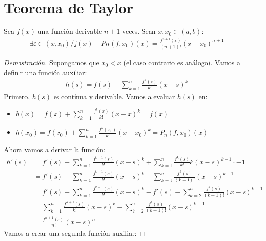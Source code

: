 \documentclass{article}
\begin{document}
\section{Teorema de Taylor}
    Sea $f(x)$ una función derivable $n+1$ veces. Sean $x,x_{0} \in  (a,b)$:
    \begin{equation}
        \begin{split}
            \exists \varepsilon \in (x,x_{0}) / f(x)-Pn(f,x_{0})(x)= \frac{f^{n+1}(\varepsilon)}{(n+1)!}(x-x_{0})^{n+1}
        \end{split}
    \end{equation}
\begin{proof}[Demostración]
    Supongamos que $x_{0}<x$ (el caso contrario es análogo). Vamos a definir una función
    auxiliar:
    \begin{equation}
        \begin{split}
            h(s)= f(s) + \sum ^n_{k=1} \frac{f^k (s)}{k!}(x-s)^{k}
        \end{split}
    \end{equation}
    Primero, $h(s)$ es contínua y derivable. Vamos a evaluar $h(s)$ en:
    \begin{itemize}
        \item $h(x)=f(x) + \sum ^n_{k=1} \frac{f^k (x)}{k!}(x-x)^{k}=f(x)$
        \item $h(x_{0})=f(x_{0})+\sum ^n_{k=1} \frac{f^k (x_{0})}{k!}(x-x_{0})^{k}= P_{n}(f,x_{0})(x)$
    \end{itemize}
    Ahora vamos a derivar la función:
    \begin{equation}
        \begin{split}
            h'(s) &= f'(s)+ \sum _{k=1} ^n \frac{f^{k+1}(s)}{k!} (x-s)^{k} +\sum ^n_{k=1}
            \frac{f^k (s)}{k!}k(x-s)^{k-1}\cdot -1\\
            &= f'(s)+ \sum _{k=1} ^n \frac{f^{k+1}(s)}{k!} (x-s)^{k} - 
            \sum ^n_{k=1} \frac{f^k (s)}{(k-1)!}(x-s)^{k-1}\\
            &= f'(s) + \sum _{k=1} ^n \frac{f^{k+1}(s)}{k!} (x-s)^{k} -
            f'(s ) -\sum ^n_{k=2} \frac{f^k (s)}{(k-1)!}(x-s)^{k-1}\\
            &= \sum _{k=1} ^n \frac{f^{k+1}(s)}{k!} (x-s)^{k}-\sum ^n_{k=2} \frac{f^k (s)}{(k-1)!}(x-s)^{k-1}\\
            &= \frac{f^{n+1}(s)}{n!}(x-s)^{n}
        \end{split}
    \end{equation}
    Vamos a crear una segunda función auxiliar:

\end{proof}
\end{document}
